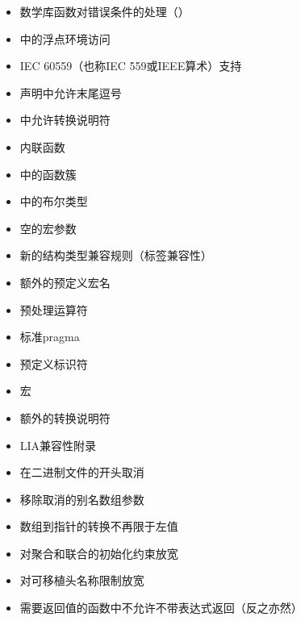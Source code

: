 \begin{itemize}
  \item{数学库函数对错误条件的处理（）}
  \item{中的浮点环境访问}
  \item{IEC 60559（也称IEC 559或IEEE算术）支持}
  \item{声明中允许末尾逗号}
  \item{中允许转换说明符}
  \item{内联函数}
  \item{中的函数簇}
  \item{中的布尔类型}
  \item{空的宏参数}
  \item{新的结构类型兼容规则（标签兼容性）}
  \item{额外的预定义宏名}
  \item{预处理运算符}
  \item{标准pragma}
  \item{预定义标识符}
  \item{宏}
  \item{额外的转换说明符}
  \item{LIA兼容性附录}
  \item{在二进制文件的开头取消}
  \item{移除取消的别名数组参数}
  \item{数组到指针的转换不再限于左值}
  \item{对聚合和联合的初始化约束放宽}
  \item{对可移植头名称限制放宽}
  \item{需要返回值的函数中不允许不带表达式返回（反之亦然）}
\end{itemize}
